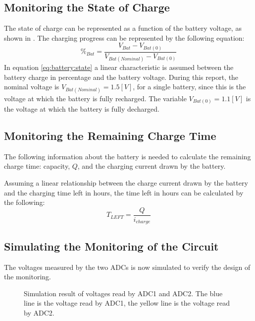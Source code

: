 \documentclass[../report.tex]{subfiles}
\begin{document}
\subsection{Monitoring the State of Charge}
The state of charge can be represented as a function of the battery voltage, as shown in \cite{rsbattery}. The charging progress can be represented by the following equation:
\begin{equation} \label{eq:battery:state}
    \%_{Bat} = \frac{V_{Bat} - V_{Bat(0)}}{V_{Bat(Nominal)} - V_{Bat(0)}}
\end{equation}
In equation \ref{eq:battery:state} a linear characteristic is assumed between the battery charge in percentage and the battery voltage. During this report, the nominal voltage is $V_{Bat(Nominal)} = 1.5 [V]$, for a single battery, since this is the voltage at which the battery is fully recharged. The variable $V_{Bat(0)} = 1.1 [V]$ is the voltage at which the battery is fully decharged.

\subsection{Monitoring the Remaining Charge Time}
The following information about the battery is needed to calculate the remaining charge time: capacity, $Q$, and the charging current drawn by the battery.

Assuming a linear relationship between the charge current drawn by the battery and the charging time left in hours, the time left in hours can be calculated by the following:
\begin{equation}
    T_{LEFT} = \frac{Q}{i_{charge}}
\end{equation}

\subsection{Simulating the Monitoring of the Circuit}
The voltages measured by the two ADCs is now simulated to verify the design of the monitoring.

\begin{figure}[H]
    \centering
    \noindent{}
    \caption{Simulation result of voltages read by ADC1 and ADC2. The blue line is the voltage read by ADC1, the yellow line is the voltage read by ADC2.}
    \label{fig:circuit:sim:monitoring}
\end{figure}
\end{document}
